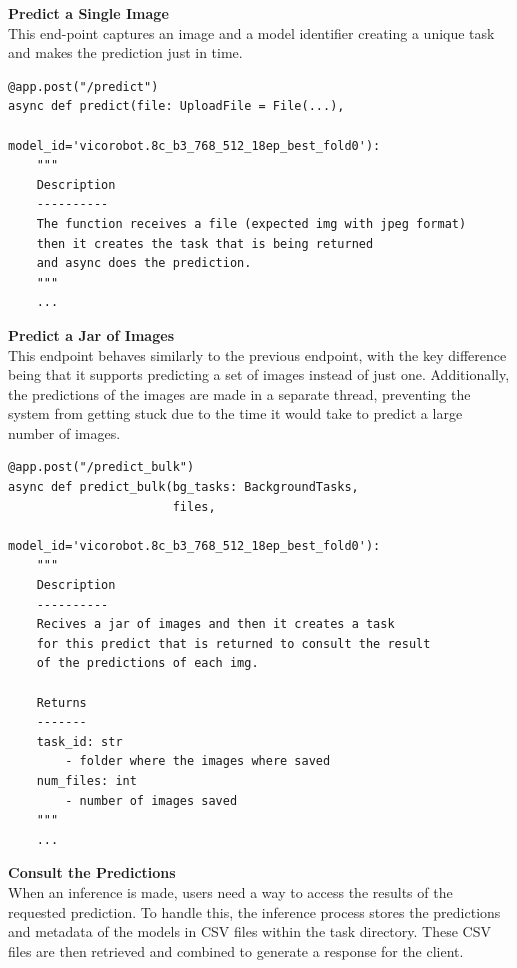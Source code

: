 \vspace{0.5cm}
\textbf{Predict a Single Image} \\

This end-point captures an image and a model identifier creating a unique task and makes the prediction just in time.

\begin{Verbatim}[fontsize=\small]
@app.post("/predict")
async def predict(file: UploadFile = File(...), 
                    model_id='vicorobot.8c_b3_768_512_18ep_best_fold0'): 
    """
    Description
    ----------
    The function receives a file (expected img with jpeg format)
    then it creates the task that is being returned
    and async does the prediction.
    """
    ...
\end{Verbatim}          

\vspace{0.5cm}
\textbf{Predict a Jar of Images} \\

This endpoint behaves similarly to the previous endpoint, with the key difference being that it supports predicting a set of images instead of just one. Additionally, the predictions of the images are made in a separate thread, preventing the system from getting stuck due to the time it would take to predict a large number of images.

\begin{Verbatim}[fontsize=\small]
@app.post("/predict_bulk")
async def predict_bulk(bg_tasks: BackgroundTasks,
                       files,
                       model_id='vicorobot.8c_b3_768_512_18ep_best_fold0'):
    """
    Description
    ----------
    Recives a jar of images and then it creates a task
    for this predict that is returned to consult the result
    of the predictions of each img.

    Returns
    -------
    task_id: str
        - folder where the images where saved
    num_files: int
        - number of images saved
    """
    ...
\end{Verbatim}

\vspace{0.5cm}
\textbf{Consult the Predictions} \\

When an inference is made, users need a way to access the results of the requested prediction. To handle this, the inference process stores the predictions and metadata of the models in CSV files within the task directory. These CSV files are then retrieved and combined to generate a response for the client.

